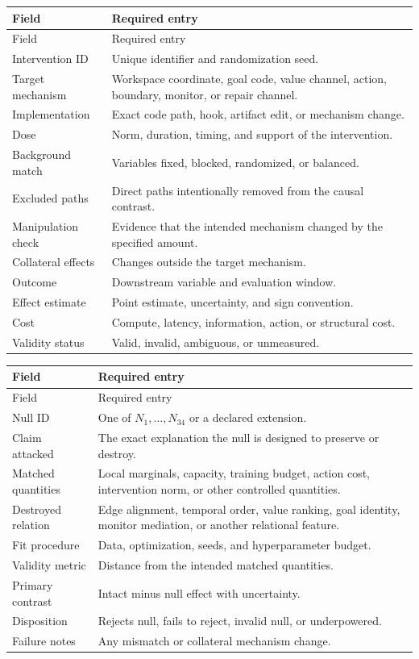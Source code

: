 \begin{longtable}{@{}p{}p{}@{}}
\toprule
Field & Required entry \\
\midrule
\endfirsthead
\toprule
Field & Required entry \\
\midrule
\endhead
Intervention ID & Unique identifier and randomization seed. \\
Target mechanism & Workspace coordinate, goal code, value channel, action,
boundary, monitor, or repair channel. \\
Implementation & Exact code path, hook, artifact edit, or mechanism change. \\
Dose & Norm, duration, timing, and support of the intervention. \\
Background match & Variables fixed, blocked, randomized, or balanced. \\
Excluded paths & Direct paths intentionally removed from the causal contrast. \\
Manipulation check & Evidence that the intended mechanism changed by the
specified amount. \\
Collateral effects & Changes outside the target mechanism. \\
Outcome & Downstream variable and evaluation window. \\
Effect estimate & Point estimate, uncertainty, and sign convention. \\
Cost & Compute, latency, information, action, or structural cost. \\
Validity status & Valid, invalid, ambiguous, or unmeasured. \\
\bottomrule
\end{longtable}


\begin{longtable}{@{}p{}p{}@{}}
\toprule
Field & Required entry \\
\midrule
\endfirsthead
\toprule
Field & Required entry \\
\midrule
\endhead
Null ID & One of \(N_1,\ldots,N_{34}\) or a declared extension. \\
Claim attacked & The exact explanation the null is designed to preserve or
destroy. \\
Matched quantities & Local marginals, capacity, training budget, action cost,
intervention norm, or other controlled quantities. \\
Destroyed relation & Edge alignment, temporal order, value ranking, goal
identity, monitor mediation, or another relational feature. \\
Fit procedure & Data, optimization, seeds, and hyperparameter budget. \\
Validity metric & Distance from the intended matched quantities. \\
Primary contrast & Intact minus null effect with uncertainty. \\
Disposition & Rejects null, fails to reject, invalid null, or underpowered. \\
Failure notes & Any mismatch or collateral mechanism change. \\
\bottomrule
\end{longtable}


